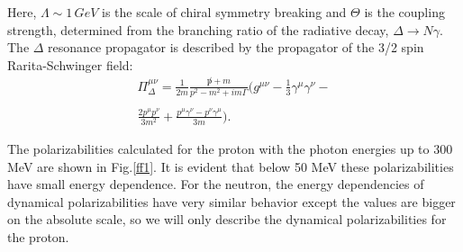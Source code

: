 \documentclass[3p,times,twocolumn]{revtex4}
\begin{document}
Here, $\Lambda\sim1\, GeV$ is the scale of chiral symmetry breaking
and $\Theta$ is the coupling strength, determined from the branching
ratio of the radiative decay, $\Delta\rightarrow N\gamma$.
The $\Delta$ resonance propagator is described by the propagator
of the 3/2 spin Rarita-Schwinger field:
\begin{eqnarray}
\Pi_{\Delta}^{\mu\nu}=\frac{1}{2m}\frac{\not p+m}{p^{2}-m^{2}+im\Gamma}\Big(g^{\mu\nu}-\frac{1}{3}\gamma^{\mu}\gamma^{\nu}-\nonumber \\ \nonumber \\
\frac{2p^{\mu}p^{\nu}}{3m^{2}}+\frac{p^{\mu}\gamma^{\nu}-p^{\nu}\gamma^{\mu}}{3m}\Big).\label{eq:10-1}
\end{eqnarray}


The polarizabilities calculated for the proton with the photon energies
up to 300 MeV are shown in Fig.\ref{ff1}. It is evident that
below 50 MeV these polarizabilities have small energy dependence. For the neutron,
the energy dependencies of dynamical polarizabilities have very similar
behavior except the values are bigger on the absolute scale, so we
will only describe the dynamical polarizabilities for the proton. 
\end{document}
